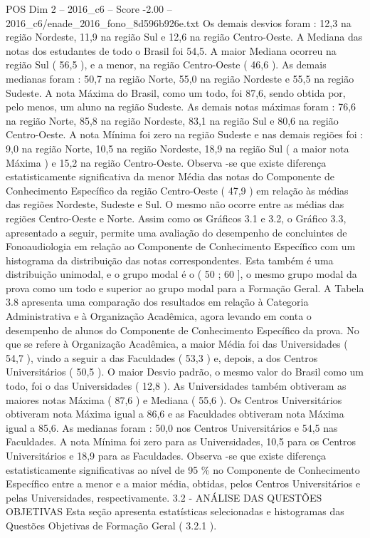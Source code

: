 \begin{textsample}{POS Dim 2 – 2016\_c6 – Score -2.00 – 2016\_c6/enade\_2016\_fono\_8d596b926e.txt}
Os demais desvios foram : 12,3 na região Nordeste, 11,9 na região Sul e 12,6 na região Centro-Oeste.
A Mediana das notas dos estudantes de todo o Brasil foi 54,5.
A maior Mediana ocorreu na região Sul ( 56,5 ), e a menor, na região Centro-Oeste ( 46,6 ).
As demais medianas foram : 50,7 na região Norte, 55,0 na região Nordeste e 55,5 na região Sudeste.
A nota Máxima do Brasil, como um todo, foi 87,6, sendo obtida por, pelo menos, um aluno na região Sudeste.
As demais notas máximas foram : 76,6 na região Norte, 85,8 na região Nordeste, 83,1 na região Sul e 80,6 na região Centro-Oeste.
A nota Mínima foi zero na região Sudeste e nas demais regiões foi : 9,0 na região Norte, 10,5 na região Nordeste, 18,9 na região Sul ( a maior nota Máxima ) e 15,2 na região Centro-Oeste.
Observa -se que existe diferença estatisticamente significativa da menor Média das notas do Componente de Conhecimento Específico da região Centro-Oeste ( 47,9 ) em relação às médias das regiões Nordeste, Sudeste e Sul.
O mesmo não ocorre entre as médias das regiões Centro-Oeste e Norte.
Assim como os Gráficos 3.1 e 3.2, o Gráfico 3.3, apresentado a seguir, permite uma avaliação do desempenho de concluintes de Fonoaudiologia em relação ao Componente de Conhecimento Específico com um histograma da distribuição das notas correspondentes.
Esta também é uma distribuição unimodal, e o grupo modal é o ( 50 ; 60 ], o mesmo grupo modal da prova como um todo e superior ao grupo modal para a Formação Geral.
A Tabela 3.8 apresenta uma comparação dos resultados em relação à Categoria Administrativa e à Organização Acadêmica, agora levando em conta o desempenho de alunos do Componente de Conhecimento Específico da prova.
No que se refere à Organização Acadêmica, a maior Média foi das Universidades ( 54,7 ), vindo a seguir a das Faculdades ( 53,3 ) e, depois, a dos Centros Universitários ( 50,5 ).
O maior Desvio padrão, o mesmo valor do Brasil como um todo, foi o das Universidades ( 12,8 ).
As Universidades também obtiveram as maiores notas Máxima ( 87,6 ) e Mediana ( 55,6 ).
Os Centros Universitários obtiveram nota Máxima igual a 86,6 e as Faculdades obtiveram nota Máxima igual a 85,6.
As medianas foram : 50,0 nos Centros Universitários e 54,5 nas Faculdades.
A nota Mínima foi zero para as Universidades, 10,5 para os Centros Universitários e 18,9 para as Faculdades.
Observa -se que existe diferença estatisticamente significativas ao nível de 95 \% no Componente de Conhecimento Específico entre a menor e a maior média, obtidas, pelos Centros Universitários e pelas Universidades, respectivamente. 3.2 - ANÁLISE DAS QUESTÕES OBJETIVAS Esta seção apresenta estatísticas selecionadas e histogramas das Questões Objetivas de Formação Geral ( 3.2.1 ).

\end{textsample}
